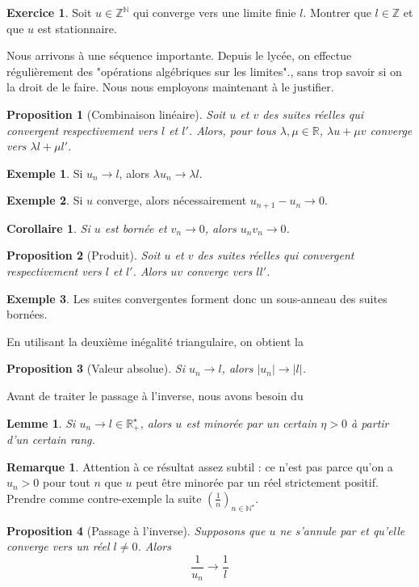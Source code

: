 \documentclass[french]{book}
\newcommand{\N}{\mathbb{N}}
\newcommand{\Z}{\mathbb{Z}}
\newcommand{\R}{\mathbb{R}}
\newcommand{\st}{^\star}
\theoremstyle{plain}
\newtheorem{lem}{Lemme}[chapter]
\newtheorem{prop}{Proposition}[chapter]
\newtheorem{cor}{Corollaire}[chapter]
\theoremstyle{definition}
\newtheorem{exa}{Exemple}[chapter]
\newtheorem{rmq}{Remarque}[chapter]
\newtheorem{exe}{Exercice}[chapter]
\theoremstyle{remark}
\begin{document}
\begin{exe}
	Soit $u\in\Z^\N$ qui converge vers une limite finie $l$. Montrer que $l\in\Z$ et que $u$ est stationnaire.
\end{exe}
Nous arrivons à une séquence importante. Depuis le lycée, on effectue régulièrement des "opérations algébriques sur les limites"., sans trop savoir si on la droit de le faire. Nous nous employons maintenant à le justifier.
\begin{prop}[Combinaison linéaire]
	Soit $u$ et $v$ des suites réelles qui convergent respectivement vers $l$ et $l'$. Alors, pour tous $\lambda,\mu\in\R$, $\lambda u +\mu v$ converge vers $\lambda l+\mu l'$.
\end{prop}
\begin{exa}
	Si $u_n\rightarrow l$, alors $\lambda u_n\rightarrow \lambda l$.
\end{exa}
\begin{exa}
	Si $u$ converge, alors nécessairement $u_{n+1}-u_n\rightarrow0$.
\end{exa}
\begin{cor}
	Si $u$ est bornée et $v_n\rightarrow0$, alors $u_nv_n\rightarrow0$.
\end{cor}
\begin{prop}[Produit]
	Soit $u$ et $v$ des suites réelles qui convergent respectivement vers $l$ et $l'$. Alors $uv$ converge vers $ll'$.
\end{prop}
\begin{exa}
	Les suites convergentes forment donc un sous-anneau des suites bornées.
\end{exa}
En utilisant la deuxième inégalité triangulaire, on obtient la
\begin{prop}[Valeur absolue]
	Si $u_n\rightarrow l$, alors $\lvert u_n\rvert\rightarrow \lvert l\rvert$.
\end{prop}
Avant de traiter le passage à l'inverse, nous avons besoin du
\begin{lem}
	Si $u_n\rightarrow l\in\R_+\st$, alors $u$ est minorée par un certain $\eta>0$ à partir d'un certain rang.
\end{lem}
\begin{rmq}
	Attention à ce résultat assez subtil : ce n'est pas parce qu'on a $u_n>0$ pour tout $n$ que $u$ peut être minorée par un réel strictement positif. Prendre comme contre-exemple la suite $\displaystyle\left(\frac{1}{n}\right)_{n\in\N\st}$.
\end{rmq}
\begin{prop}[Passage à l'inverse]
	Supposons que $u$ ne s'annule par et qu'elle converge vers un réel $l\ne0$. Alors $$\frac{1}{u_n}\rightarrow\frac1l$$
\end{prop}
\end{document}

